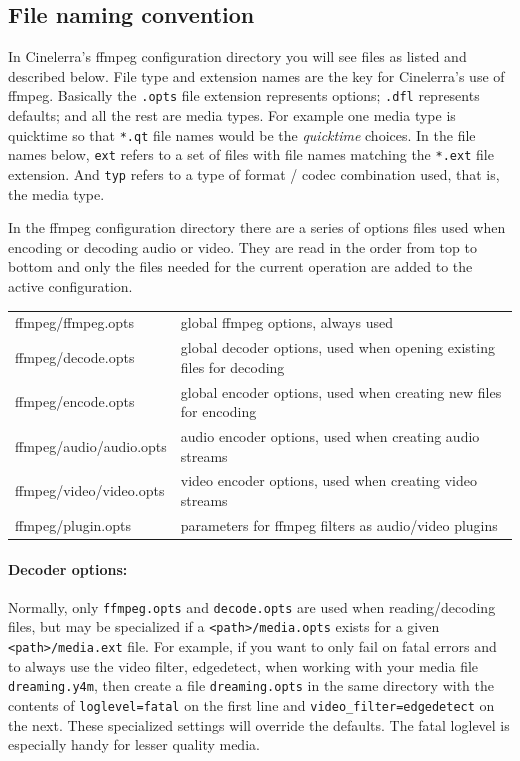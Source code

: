 \subsection{File naming convention}%
\label{sub:file_naming_convention}

In Cinelerra's ffmpeg configuration directory you will see files as listed and described below.  File type and extension names are the key for Cinelerra's use of ffmpeg.  Basically the \texttt{.opts} file extension represents options; \texttt{.dfl} represents defaults; and all the rest are media types.  For example one media type is quicktime so that \texttt{*.qt} file names would be the \textit{quicktime} choices.  In the file names below, \texttt{ext} refers to a set of files with file names matching the \texttt{*.ext} file extension.  And \texttt{typ} refers to a type of format / codec combination used, that is, the media type.

In the ffmpeg configuration directory there are a series of options files used when encoding or decoding audio or video.  They are read in the order from top to bottom and only the files needed for the current operation are added to the active configuration.

\begin{center}
    \begin{tabular}{l l}
        \toprule
        ffmpeg/ffmpeg.opts & global ffmpeg options, always used \\
        ffmpeg/decode.opts & global decoder options, used when opening existing files for decoding \\
        ffmpeg/encode.opts & global encoder options, used when creating new files for encoding \\
        ffmpeg/audio/audio.opts & audio encoder options, used when creating audio streams \\
        ffmpeg/video/video.opts & video encoder options, used when creating video streams \\
        ffmpeg/plugin.opts & parameters for ffmpeg filters as audio/video plugins \\
        \bottomrule
    \end{tabular}
\end{center}

\paragraph{Decoder options:} Normally, only \texttt{ffmpeg.opts} and \texttt{decode.opts} are used when reading/decoding files, but may be specialized if a \texttt{<path>/media.opts} exists for a given \texttt{<path>/media.ext} file.  For example, if you want to only fail on fatal errors and to always use the video filter, edgedetect, when working with your media file \texttt{dreaming.y4m}, then create a file \texttt{dreaming.opts} in the same directory with the contents of \texttt{loglevel=fatal} on the first line and \texttt{video\_filter=edgedetect} on the next.  These specialized settings will override the defaults.  The fatal loglevel is especially handy for lesser quality media.

